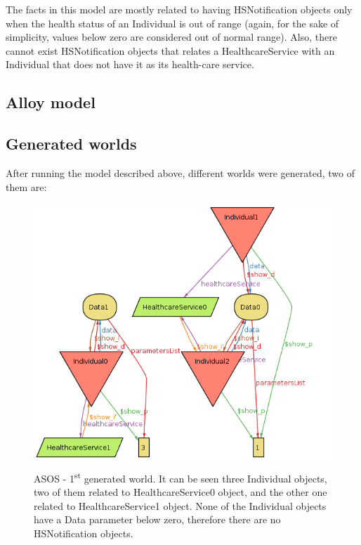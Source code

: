 \documentclass[a4paper, hidelinks, 12pt]{report}
\begin{document}
	The facts in this model are mostly related to having HSNotification objects only when the health status of an Individual is out of range (again, for the sake of simplicity, values below zero are considered out of normal range). Also, there cannot exist HSNotification objects that relates a HealthcareService with an Individual that does not have it as its health-care service.
	
	\subsection{Alloy model}
	\vspace{2 mm}
	
	
	
	\vspace{8 mm}
	
	\subsection{Generated worlds}
	After running the model described above, different worlds were generated, two of them are:
	
	\begin{figure}[H]
		\centering
		\includegraphics[width=1\textwidth]{Diagrams/goal_5_world_1.png}
		\caption[ASOS - First generated world]{ASOS - 1\textsuperscript{st} generated world. It can be seen three Individual objects, two of them related to HealthcareService0 object, and the other one related to HealthcareService1 object. None of the Individual objects have a Data parameter below zero, therefore there are no HSNotification objects.}
		\label{fig:goal_5_world_1}
	\end{figure}
	
\end{document}
